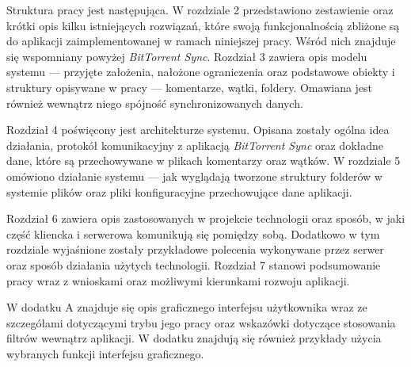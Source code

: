 Struktura pracy jest następująca. W rozdziale 2 przedstawiono zestawienie oraz krótki opis kilku istniejących rozwiązań, które swoją funkcjonalnością zbliżone są do aplikacji zaimplementowanej w ramach niniejszej pracy. Wśród nich znajduje się wspomniany powyżej \emph{BitTorrent Sync}. Rozdział 3 zawiera opis modelu systemu --- przyjęte założenia, nałożone ograniczenia oraz podstawowe obiekty i struktury opisywane w pracy --- komentarze, wątki, foldery. Omawiana jest również wewnątrz niego spójność synchronizowanych danych.

Rozdział 4 poświęcony jest architekturze systemu. Opisana zostały ogólna idea działania, protokół komunikacyjny z aplikacją \emph{BitTorrent Sync} oraz dokładne dane, które są przechowywane w plikach komentarzy oraz wątków. W rozdziale 5 omówiono działanie systemu --- jak wyglądają tworzone struktury folderów w systemie plików oraz pliki konfiguracyjne przechowujące dane aplikacji.

Rozdział 6 zawiera opis zastosowanych w projekcie technologii oraz sposób, w jaki część kliencka i serwerowa komunikują się pomiędzy sobą. Dodatkowo w tym rozdziale wyjaśnione zostały przykładowe polecenia wykonywane przez serwer oraz sposób działania użytych technologii. Rozdział 7 stanowi podsumowanie pracy wraz z wnioskami oraz możliwymi kierunkami rozwoju aplikacji.

W dodatku A znajduje się opis graficznego interfejsu użytkownika wraz ze szczegółami dotyczącymi trybu jego pracy oraz wskazówki dotyczące stosowania filtrów wewnątrz aplikacji. W dodatku znajdują się również przykłady użycia wybranych funkcji interfejsu graficznego.
